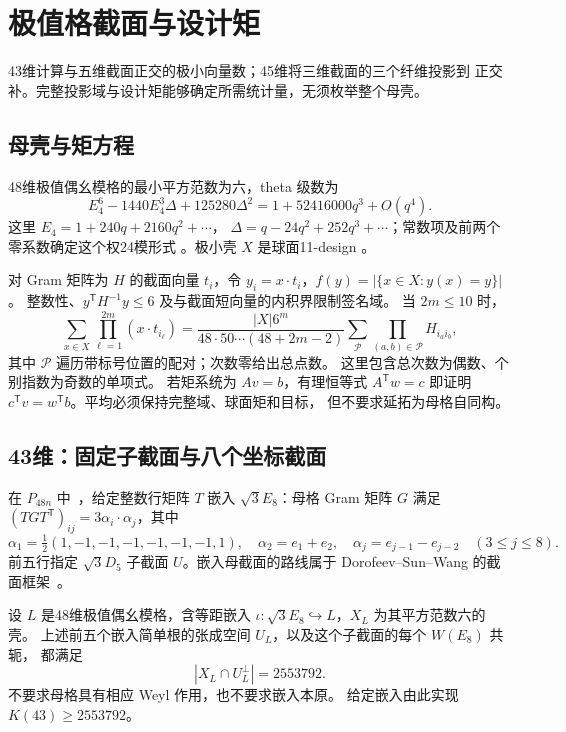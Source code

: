 \section{极值格截面与设计矩}
\label{sec:sections}

43维计算与五维截面正交的极小向量数；45维将三维截面的三个纤维投影到
正交补。完整投影域与设计矩能够确定所需统计量，无须枚举整个母壳。

\subsection{母壳与矩方程}
48维极值偶幺模格的最小平方范数为六，theta 级数为
\[
E_4^6-1440E_4^3\Delta+125280\Delta^2
=1+52416000q^3+O(q^4).
\]
这里 $E_4=1+240q+2160q^2+\cdots$，
$\Delta=q-24q^2+252q^3+\cdots$；常数项及前两个零系数确定这个权24模形式
\cite{conway1999sphere}。极小壳 $X$ 是球面11-design
\cite[定理4.1]{nebe-designs}。

对 Gram 矩阵为 $H$ 的截面向量 $t_i$，令
$y_i=x\cdot t_i$，$f(y)=|\{x\in X:y(x)=y\}|$。
整数性、$y^{\mathsf T}H^{-1}y\le6$ 及与截面短向量的内积界限制签名域。
当 $2m\le10$ 时，
\begin{equation}\label{eq:section-moment}
\sum_{x\in X}\prod_{\ell=1}^{2m}(x\cdot t_{i_\ell})
=\frac{|X|6^m}{48\cdot50\cdots(48+2m-2)}
\sum_{\mathcal P}\prod_{(a,b)\in\mathcal P}H_{i_ai_b},
\end{equation}
其中 $\mathcal P$ 遍历带标号位置的配对；次数零给出总点数。
这里包含总次数为偶数、个别指数为奇数的单项式。
若矩系统为 $Av=b$，有理恒等式 $A^{\mathsf T}w=c$ 即证明
$c^{\mathsf T}v=w^{\mathsf T}b$。平均必须保持完整域、球面矩和目标，
但不要求延拓为母格自同构。

\subsection{43维：固定子截面与八个坐标截面}
在 $P_{48n}$ 中~\cite{latticecatalogue}，给定整数行矩阵 $T$ 嵌入
$\sqrt3E_8$：母格 Gram 矩阵 $G$ 满足
$(TGT^{\mathsf T})_{ij}=3\alpha_i\cdot\alpha_j$，其中
\[
\alpha_1=\tfrac12(1,-1,-1,-1,-1,-1,-1,1),\quad
\alpha_2=e_1+e_2,\quad
\alpha_j=e_{j-1}-e_{j-2}\quad(3\le j\le8).
\]
前五行指定 $\sqrt3D_5$ 子截面 $U$。嵌入母截面的路线属于
Dorofeev--Sun--Wang 的截面框架~\cite{dorofeev}。

\begin{proposition}[$E_8$ 扩张计数]\label{prop:section43}
设 $L$ 是48维极值偶幺模格，含等距嵌入
$\iota:\sqrt3E_8\hookrightarrow L$，$X_L$ 为其平方范数六的壳。
上述前五个嵌入简单根的张成空间 $U_L$，以及这个子截面的每个 $W(E_8)$ 共轭，
都满足
\[
|X_L\cap U_L^\perp|=2553792.
\]
不要求母格具有相应 Weyl 作用，也不要求嵌入本原。
给定嵌入由此实现 $K(43)\ge2553792$。
\end{proposition}

